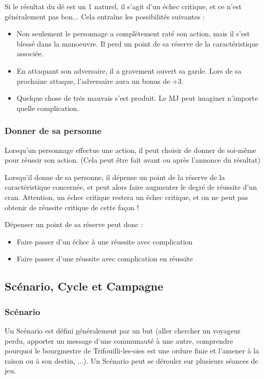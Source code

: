 Si le résultat du dé est un 1 naturel, il s'agit d'un échec critique, et ce n'est généralement pas bon... Cela entraîne les possibilités suivantes :

\begin{itemize}
	\item Non seulement le personnage a complètement raté son action, mais il s'est blessé dans la manoeuvre. Il perd un point de sa réserve de la caractéristique associée.
	\item En attaquant son adversaire, il a gravement ouvert sa garde. Lors de sa prochaine attaque, l'adversaire aura un bonus de +3.
	\item Quelque chose de très mauvais s'est produit. Le MJ peut imaginer n'importe quelle complication.
\end{itemize}

\subsubsection*{Donner de sa personne}

Lorsqu'un personnage effectue une action, il peut choisir de donner de soi-même pour réussir son action. (Cela peut être fait avant ou après l'annonce du résultat)

Lorsqu'il donne de sa personne, il dépense un point de la réserve de la caractéristique concernée, et peut alors faire augmenter le degré de réussite d'un cran. Attention, un échec critique restera un échec critique, et on ne peut pas obtenir de réussite critique de cette façon !

Dépenser un point de sa réserve peut donc :

\begin{itemize}
	\item Faire passer d'un échec à une réussite avec complication
	\item Faire passer d'une réussite avec complication en réussite
\end{itemize}

\subsection{Scénario, Cycle et Campagne}

\subsubsection*{Scénario}

Un Scénario est défini généralement par un but (aller chercher un voyageur perdu, apporter un message d'une communauté à une autre, comprendre pourquoi le bourgmestre de Trifouilli-les-oies est une ordure finie et l'amener à la raison ou à son destin, ...). Un Scénario peut se dérouler sur plusieurs séances de jeu.

